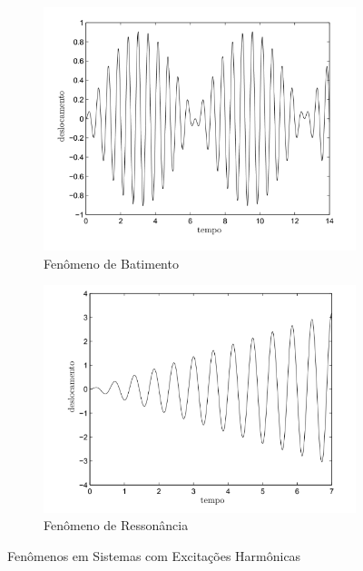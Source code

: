 \documentclass{article}
\begin{document}
                \begin{figure}[h]
                    \begin{subfigure}{0.5\textwidth}
                        \centering
                        \includegraphics[width=\textwidth]{imgs/batimento.png}
                        \caption{Fenômeno de Batimento}
                    \end{subfigure}%
                \begin{subfigure}{0.5\textwidth}
                    \centering
                        \includegraphics[width=\textwidth]{imgs/reso.png}
                        \caption{Fenômeno de Ressonância}
                    \end{subfigure}
                    \caption{Fenômenos em Sistemas com Excitações Harmônicas}
                \end{figure}
\end{document}
